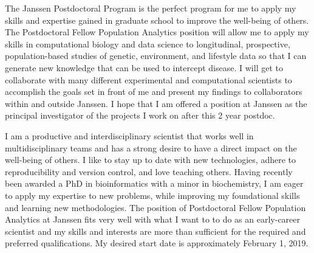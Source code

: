 \documentclass[11pt, letterpaper]{CV_latex_class}
\begin{document}
\begin{cvletter}

\hspace{1em} The Janssen Postdoctoral Program is the perfect program for me to apply my skills and expertise gained in graduate school to improve the well-being of others. The Postdoctoral Fellow Population Analytics position will allow me to apply my skills in computational biology and data science to longitudinal, prospective, population-based studies of genetic, environment, and lifestyle data so that I can generate new knowledge that can be used to intercept disease. I will get to collaborate with many different experimental and computational scientists to accomplish the goals set in front of me and present my findings to collaborators within and outside Janssen. I hope that I am offered a position at Janssen as the principal investigator of the projects I work on after this 2 year postdoc.



\hspace{1em} I am a productive and interdisciplinary scientist that works well in multidisciplinary teams and has a strong desire to have a direct impact on the well-being of others. I like to stay up to date with new technologies, adhere to reproducibility and version control, and love teaching others. Having recently been awarded a PhD in bioinformatics with a minor in biochemistry, I am eager to apply my expertise to new problems, while improving my foundational skills and learning new methodologies. The position of Postdoctoral Fellow Population Analytics at Janssen fits very well with what I want to to do as an early-career scientist and my skills and interests are more than sufficient for the required and preferred qualifications. My desired start date is approximately February 1, 2019.

\end{cvletter}


\makeletterclosing

\end{document}
